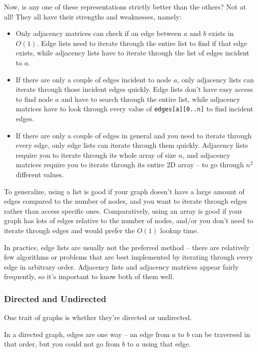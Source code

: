 Now, is any one of these representations strictly better than the others? Not at all! They all have their strengths and weaknesses, namely:
\begin{itemize}
\item Only adjacency matrices can check if an edge between $a$ and $b$ exists in $O(1)$. Edge lists need to iterate through the entire list to find if that edge exists, while adjacency lists have to iterate through the list of edges incident to $a$.
\item If there are only a couple of edges incident to node $a$, only adjacency lists can iterate through those incident edges quickly. Edge lists don't have easy access to find node $a$ and have to search through the entire list, while adjacency matrices have to look through every value of \texttt{edges[a][0..n]} to find incident edges.
\item If there are only a couple of edges in general and you need to iterate through every edge, only edge lists can iterate through them quickly. Adjacency lists require you to iterate through its whole array of size $n$, and adjacency matrices require you to iterate through its entire 2D array -- to go through $n^2$ different values.
\end{itemize}
To generalize, using a list is good if your graph doesn't have a large amount of edges compared to the number of nodes, and you want to iterate through edges rather than access specific ones. Comparatively, using an array is good if your graph has lots of edges relative to the number of nodes, and/or you don't need to iterate through edges and would prefer the $O(1)$ lookup time.

In practice, edge lists are usually not the preferred method -- there are relatively few algorithms or problems that are best implemented by iterating through every edge in arbitrary order. Adjacency lists and adjacency matrices appear fairly frequently, so it's important to know both of them well.

\subsubsection{Directed and Undirected}
 

One trait of graphs is whether they're directed or undirected.

In a directed graph, edges are one way -- an edge from $a$ to $b$ can be traversed in that order, but you could not go from $b$ to $a$ using that edge.

